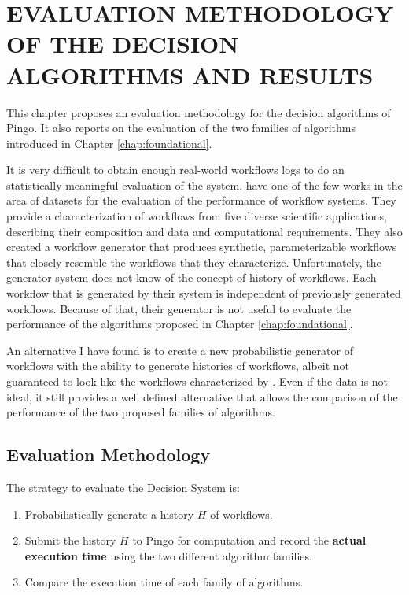 \chapter{EVALUATION METHODOLOGY OF THE DECISION ALGORITHMS AND RESULTS}
\label{chap:evaluation}
This chapter proposes an evaluation methodology for the decision algorithms of Pingo.  It also reports on the evaluation of the two families of algorithms introduced in Chapter \ref{chap:foundational}.

It is very difficult to obtain enough real-world workflows logs to do an statistically meaningful evaluation of the system. \cite{bharathi2008characterization} have one of the few works in the area of datasets for the evaluation of the performance of workflow systems. They provide a characterization of workflows from five diverse scientific applications, describing their composition and data and computational requirements. They also created a workflow generator that produces synthetic, parameterizable workflows that closely resemble the workflows that they characterize. Unfortunately, the generator system does not know of the concept of history of workflows. Each workflow that is generated by their system is independent of previously generated workflows.  Because of that, their generator is not useful to evaluate the performance of the algorithms proposed in Chapter \ref{chap:foundational}.

An alternative I have found is to create a new probabilistic generator of workflows with the ability to generate histories of workflows, albeit not guaranteed to look like the workflows characterized by \cite{bharathi2008characterization}.  Even if the data is not ideal, it still provides a well defined alternative that allows the comparison of the performance of the two proposed families of algorithms. 

\section{Evaluation Methodology}
The strategy to evaluate the Decision System is:
\begin{enumerate}
\item Probabilistically generate a history $H$ of workflows.
\item Submit the history $H$ to Pingo for computation and record the \textbf{actual execution time} using the two different algorithm families.
\item Compare the execution time of each family of algorithms.
\end{enumerate}
